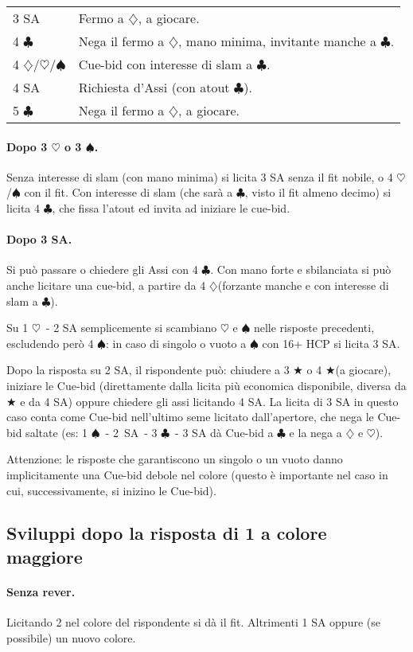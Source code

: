 \documentclass[a4paper,10pt]{article}
\renewcommand{\c}{$\clubsuit$\xspace}
\renewcommand{\d}{$\diamondsuit$\xspace}
\newcommand{\h}{$\heartsuit$\xspace}
\newcommand{\s}{$\spadesuit$\xspace}
\renewcommand{\j}{$\bigstar$\xspace}
\newcommand{\sa}{SA\xspace}
\newcommand{\smallspace}{\vskip0.3cm}
\newenvironment{twocol}
  {\smallspace\noindent\begin{tabular}{l p{0.78\textwidth}}}
  {\end{tabular}\smallspace}
\begin{document}
\begin{twocol}
	3 \sa & Fermo a \d, a giocare. \\
	4 \c & Nega il fermo a \d, mano minima, invitante manche a \c. \\
	4 \d/\h/\s & Cue-bid con interesse di slam a \c. \\
	4 \sa & Richiesta d'Assi (con atout \c). \\
	5 \c & Nega il fermo a \d, a giocare.
\end{twocol}

\paragraph{Dopo 3 \h o 3 \s.} Senza interesse di slam (con mano minima) si licita 3 \sa senza il fit nobile, o 4 \h/\s con il fit. Con interesse di slam (che sarà a \c, visto il fit almeno decimo) si licita 4 \c, che fissa l'atout ed invita ad iniziare le cue-bid.

\paragraph{Dopo 3 \sa.} Si può passare o chiedere gli Assi con 4 \c. Con mano forte e sbilanciata si può anche licitare una cue-bid, a partire da 4 \d (forzante manche e con interesse di slam a \c).

\noindent Su 1 \h\ - 2 \sa semplicemente si scambiano \h e \s nelle risposte precedenti, escludendo però 4 \s: in caso di singolo o vuoto a \s con 16+ HCP si licita 3 \sa.

Dopo la risposta su 2 \sa, il rispondente può: chiudere a 3 \j o 4 \j (a giocare), iniziare le Cue-bid (direttamente dalla licita più economica disponibile, diversa da \j e da 4 \sa) oppure chiedere gli assi licitando 4 \sa. La licita di 3 \sa in questo caso conta come Cue-bid nell'ultimo seme licitato dall'apertore, che nega le Cue-bid saltate (es: 1 \s\ - \mbox{2 \sa}\ - 3 \c\ - 3 \sa dà Cue-bid a \c e la nega a \d e \h).

Attenzione: le risposte che garantiscono un singolo o un vuoto danno implicitamente una Cue-bid debole nel colore (questo è importante nel caso in cui, successivamente, si inizino le Cue-bid).


\subsection{Sviluppi dopo la risposta di 1 a colore maggiore}

\paragraph{Senza rever.} Licitando 2 nel colore del rispondente si dà il fit. Altrimenti 1 \sa oppure (se possibile) un nuovo colore.
\end{document}
